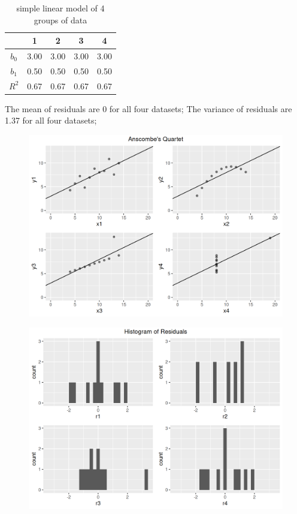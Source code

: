 \documentclass[12pt]{article}
\begin{document}
	\begin{table}[htpb]
		\centering
		\label{tab:1}
		\begin{tabular}{|c|c|c|c|c|}
			\hline
			 & 1 & 2 & 3 & 4  \\
			\hline
			$b_0$ & 3.00 & 3.00 & 3.00 & 3.00  \\
			\hline
			$b_1$ & 0.50 & 0.50 & 0.50 & 0.50  \\
			\hline
			$R^2$ & 0.67 & 0.67 & 0.67 & 0.67  \\
			\hline

		\end{tabular}
		\caption{simple linear model of 4 groups of data}
	\end{table}

	The mean of residuals are 0 for all four datasets; 
	The variance of residuals are 1.37 for all four datasets; 

\begin{figure}[htbp]
\includegraphics[width=.7\textwidth]{anscombe.png}
\centering
\end{figure}

\begin{figure}[htbp]
\includegraphics[width=.7\textwidth]{histogram.png}
\centering
\end{figure}
\end{document}
